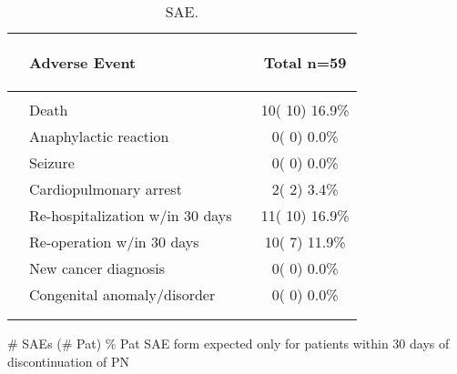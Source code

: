 \documentclass[dvips,10pt]{article}
\begin{document}
\begin{table}[t]
\caption
{ SAE. }
\begin{center}
\begin{tabular}{ @{}l@{}
@{}l@{}@{}p{1.5em}@{}@{}c@{}
}
\hline

& \parbox{6em}{\begin{center}Adverse Event\end{center}} && \parbox{6em}{\begin{center}Total n=59\end{center}} \\

\hline

\\
& Death && 10( 10) 16.9\% \\
& Anaphylactic reaction && 0(  0)  0.0\% \\
& Seizure && 0(  0)  0.0\% \\
& Cardiopulmonary arrest && 2(  2)  3.4\% \\
& Re-hospitalization w/in 30 days && 11( 10) 16.9\% \\
& Re-operation w/in 30 days && 10(  7) 11.9\% \\
& New cancer diagnosis && 0(  0)  0.0\% \\
& Congenital anomaly/disorder && 0(  0)  0.0\% \\
\\
\hline \\

\end{tabular}


\parbox{ 5in }{ \# SAEs (\# Pat) \% Pat \newline *SAE form expected only for patients within 30 days of discontinuation of PN } \\
 \vspace{1em}\end{center}
 \end{table}
\end{document}
